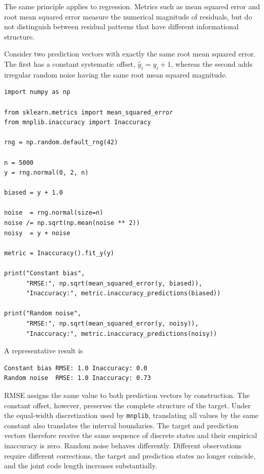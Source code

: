 The same principle applies to regression. Metrics such as mean squared error and root mean squared error measure the numerical magnitude of residuals, but do not distinguish between residual patterns that have different informational structure.

\begin{example}
\label{ex:machine_learning:inaccuracy:same_rmse}

Consider two prediction vectors with exactly the same root mean squared error. The first has a constant systematic offset, $\hat y_i=y_i+1$, whereas the second adds irregular random noise having the same root mean
squared magnitude.

\begin{sourcecode}
{\scriptsize \begin{verbatim}
import numpy as np

from sklearn.metrics import mean_squared_error
from mnplib.inaccuracy import Inaccuracy

rng = np.random.default_rng(42)

n = 5000
y = rng.normal(0, 2, n)

biased = y + 1.0

noise  = rng.normal(size=n)
noise /= np.sqrt(np.mean(noise ** 2))
noisy  = y + noise

metric = Inaccuracy().fit_y(y)

print("Constant bias",
      "RMSE:", np.sqrt(mean_squared_error(y, biased)),
      "Inaccuracy:", metric.inaccuracy_predictions(biased))

print("Random noise",
      "RMSE:", np.sqrt(mean_squared_error(y, noisy)),
      "Inaccuracy:", metric.inaccuracy_predictions(noisy))
\end{verbatim}}
\end{sourcecode}

A representative result is

\begin{sourcecode}
{\scriptsize \begin{verbatim}
Constant bias RMSE: 1.0 Inaccuracy: 0.0
Random noise  RMSE: 1.0 Inaccuracy: 0.73
\end{verbatim}}
\end{sourcecode}

RMSE assigns the same value to both prediction vectors by construction. The constant offset, however, preserves the complete structure of the target. Under the equal-width discretization used by \texttt{mnplib}, translating all values by the same constant also translates the interval boundaries. The target and prediction vectors therefore receive the same sequence of discrete states and their empirical inaccuracy is zero. Random noise behaves differently. Different observations require different corrections, the target and prediction states no longer coincide, and the joint code length increases substantially.
\end{example}

